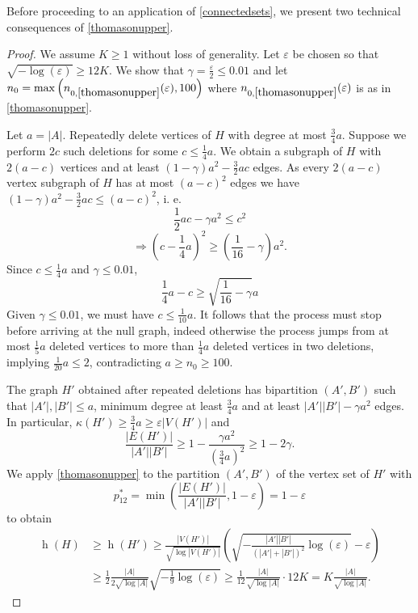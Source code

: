\documentclass{article}
\newtheorem{lem}[thm]{Lemma}
\newcommand{\eps}{\varepsilon}
\newcommand{\s}[1]{\left(#1\right)}
\DeclareMathOperator{\had}{h}
\begin{document}
Before proceeding to an application of  \cref{connectedsets}, we present two technical consequences of \cref{thomasonupper}.

\begin{proof} We assume $K \geq 1$ without loss of generality. 
	Let $\eps$ be chosen so that $\sqrt{-\log(\eps)} \geq 12 K.$ We show that $\gamma = \frac{\eps}{2} \leq 0.01$ and let $n_0 = \max \s{ n_{0,\ref{thomasonupper}}(\eps),100}$ where $n_{0,\ref{thomasonupper}}(\eps)$ is as in \cref{thomasonupper}.
		 
Let $a = |A|$. Repeatedly delete vertices of $H$ with degree at most $\frac34a$. Suppose we perform $2c$ such deletions for some $c \leq \frac14 a$. We obtain a subgraph of $H$ with $2(a - c)$ vertices and at least $(1-\gamma)a^2-\frac32 ac$ edges. As every $2(a-c)$ vertex subgraph of $H$ has at most $(a-c)^2$ edges we have $(1-\gamma)a^2 -\frac{3}{2}ac \leq (a-c)^2$, i. e.
$$\frac12 ac - \gamma a^2 \leq c^2$$
$$\Rightarrow (c-\frac14a)^2 \geq (\frac1{16} - \gamma)a^2.$$
Since $c \leq \frac14a$ and $\gamma \leq 0.01$,
$$\frac14a - c \geq \sqrt{\frac1{16}-\gamma} a$$
Given $\gamma \leq 0.01$, we must have $c \leq \frac{1}{10}{a}$. It follows that the process must stop before arriving at the null graph, indeed otherwise the process jumps from at most $\frac{1}{5}a$ deleted vertices to more than $\frac14a$ deleted vertices in two deletions, implying $\frac1{20} a \leq 2$, contradicting $a \geq n_0 \geq 100$.
	
The graph $H'$ obtained after repeated deletions has bipartition $(A',B')$ such that $ |A'|,|B'| \leq a$,  minimum degree at least $\frac{3}{4}a$ and at least $|A'||B'|-\gamma a^2$ edges. In particular, $\kappa(H') \geq \frac{3}{4}a \geq \eps |V(H')|$ and $$\frac{|E(H')|}{|A'||B'|} \geq  1 - \frac{\gamma a^2}{\s{\frac{3}{4}a}^2} \geq 1 -2 \gamma.$$ We apply \cref{thomasonupper} to the partition $(A',B')$ of the vertex set of $H'$ with $$p^*_{12}=\min\s{\frac{|E(H')|}{|A'||B'|}, 1-\eps} =1-\eps$$ to obtain
\begin{align*}\had(H) &\geq \had(H') \geq \frac{|V(H')|}{\sqrt{\log |V(H')|}}\left(\sqrt{-\frac{|A'||B'|}{(|A'|+|B'|)^2} \log(\eps)}-\eps\right)\\  &\geq \frac{1}{2}\frac{|A|}{2\sqrt{\log {|A|}}}\sqrt{-\frac{1}{9}\log(\eps)} \geq \frac{1}{12}\frac{|A|}{\sqrt{\log {|A|}}}\cdot 12K = K \frac{|A|}{\sqrt{\log{|A|}}}.  \end{align*} 
\end{proof}	
\end{document}
